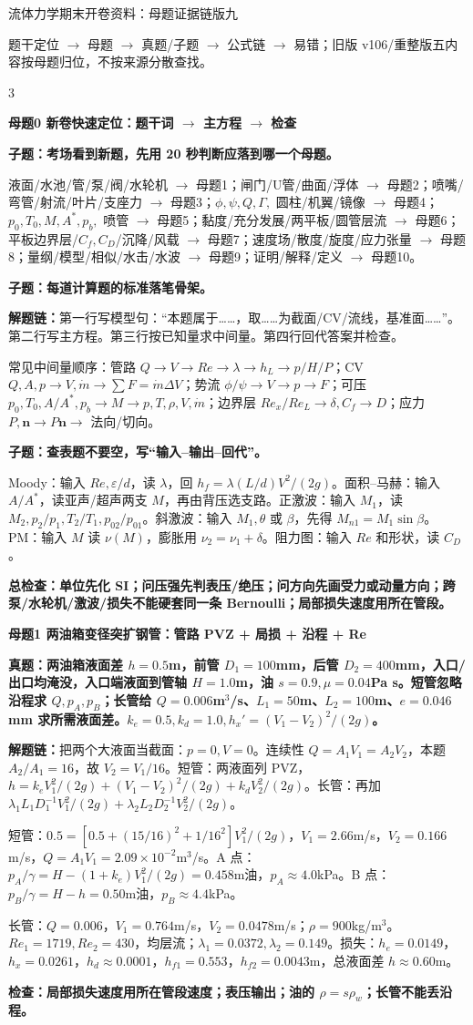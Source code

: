 \documentclass[a4paper]{article}
\newcommand{\mt}[1]{\vspace{0.45pt}\colorbox{M}{\parbox{\dimexpr\linewidth-2\fboxsep}{\color{white}\bfseries #1}}\par}
\newcommand{\qt}[1]{\vspace{0.25pt}\colorbox{Q}{\parbox{\dimexpr\linewidth-2\fboxsep}{\color{white}\bfseries #1}}\par}
\newcommand{\ans}[1]{\colorbox{G}{\parbox{\dimexpr\linewidth-2\fboxsep}{#1}}\par}
\newcommand{\warn}[1]{\colorbox{Y}{\parbox{\dimexpr\linewidth-2\fboxsep}{\color{E}\bfseries #1}}\par}
\newcommand{\chain}[1]{{\color{A}\bfseries 解题链：}#1\par}
\begin{document}
\fontsize{3.08}{3.22}\selectfont
\begin{center}
{\heiti\fontsize{6.5}{6.8}\selectfont 流体力学期末开卷资料：母题证据链版九}\par
{\fontsize{3.20}{3.38}\selectfont 题干定位 $\to$ 母题 $\to$ 真题/子题 $\to$ 公式链 $\to$ 易错；旧版 v106/重整版五内容按母题归位，不按来源分散查找。}
\end{center}
\vspace{-3.4pt}
\begin{multicols}{3}

\mt{母题0 新卷快速定位：题干词 $\to$ 主方程 $\to$ 检查}
\qt{子题：考场看到新题，先用 20 秒判断应落到哪一个母题。}
\ans{液面/水池/管/泵/阀/水轮机 $\to$ 母题1；闸门/U管/曲面/浮体 $\to$ 母题2；喷嘴/弯管/射流/叶片/支座力 $\to$ 母题3；$\phi,\psi,Q,\Gamma,$ 圆柱/机翼/镜像 $\to$ 母题4；$p_0,T_0,M,A^*,p_b,$ 喷管 $\to$ 母题5；黏度/充分发展/两平板/圆管层流 $\to$ 母题6；平板边界层/$C_f,C_D$/沉降/风载 $\to$ 母题7；速度场/散度/旋度/应力张量 $\to$ 母题8；量纲/模型/相似/水击/水波 $\to$ 母题9；证明/解释/定义 $\to$ 母题10。}
\qt{子题：每道计算题的标准落笔骨架。}
\chain{第一行写模型句：“本题属于……，取……为截面/CV/流线，基准面……”。第二行写主方程。第三行按已知量求中间量。第四行回代答案并检查。}
\ans{常见中间量顺序：管路 $Q\to V\to Re\to\lambda\to h_L\to p/H/P$；CV $Q,A,p\to V,\dot m\to \sum F=\dot m\Delta V$；势流 $\phi/\psi\to V\to p\to F$；可压 $p_0,T_0,A/A^*,p_b\to M\to p,T,\rho,V,\dot m$；边界层 $Re_x/Re_L\to\delta,C_f\to D$；应力 $P,\bm n\to P\bm n\to$ 法向/切向。}
\qt{子题：查表题不要空，写“输入--输出--回代”。}
\ans{Moody：输入 $Re,\varepsilon/d$，读 $\lambda$，回 $h_f=\lambda(L/d)V^2/(2g)$。面积--马赫：输入 $A/A^*$，读亚声/超声两支 $M$，再由背压选支路。正激波：输入 $M_1$，读 $M_2,p_2/p_1,T_2/T_1,p_{02}/p_{01}$。斜激波：输入 $M_1,\theta$ 或 $\beta$，先得 $M_{n1}=M_1\sin\beta$。PM：输入 $M$ 读 $\nu(M)$，膨胀用 $\nu_2=\nu_1+\delta$。阻力图：输入 $Re$ 和形状，读 $C_D$。}
\warn{总检查：单位先化 SI；问压强先判表压/绝压；问方向先画受力或动量方向；跨泵/水轮机/激波/损失不能硬套同一条 Bernoulli；局部损失速度用所在管段。}


\mt{母题1 两油箱变径突扩钢管：管路 PVZ + 局损 + 沿程 + Re}
\qt{真题：两油箱液面差 $h=0.5$m，前管 $D_1=100$mm，后管 $D_2=400$mm，入口/出口均淹没，入口端液面到管轴 $H=1.0$m，油 $s=0.9,\mu=0.04$Pa s。短管忽略沿程求 $Q,p_A,p_B$；长管给 $Q=0.006$m$^3$/s、$L_1=50$m、$L_2=100$m、$e=0.046$mm 求所需液面差。$k_e=0.5,k_d=1.0,h_x'=(V_1-V_2)^2/(2g)$。}
\chain{把两个大液面当截面：$p=0,V=0$。连续性 $Q=A_1V_1=A_2V_2$，本题 $A_2/A_1=16$，故 $V_2=V_1/16$。短管：两液面列 PVZ，$h=k_eV_1^2/(2g)+(V_1-V_2)^2/(2g)+k_dV_2^2/(2g)$。长管：再加 $\lambda_1L_1D_1^{-1}V_1^2/(2g)+\lambda_2L_2D_2^{-1}V_2^2/(2g)$。}
\ans{短管：$0.5=[0.5+(15/16)^2+1/16^2]V_1^2/(2g)$，$V_1=2.66$m/s，$V_2=0.166$m/s，$Q=A_1V_1=2.09\times10^{-2}$m$^3$/s。A 点：$p_A/\gamma=H-(1+k_e)V_1^2/(2g)=0.458$m油，$p_A\approx4.0$kPa。B 点：$p_B/\gamma=H-h=0.50$m油，$p_B\approx4.4$kPa。}
\ans{长管：$Q=0.006$，$V_1=0.764$m/s，$V_2=0.0478$m/s；$\rho=900$kg/m$^3$。$Re_1=1719,Re_2=430$，均层流；$\lambda_1=0.0372,\lambda_2=0.149$。损失：$h_e=0.0149$，$h_x=0.0261$，$h_d\approx0.0001$，$h_{f1}=0.553$，$h_{f2}=0.0043$m，总液面差 $h\approx0.60$m。}
\warn{检查：局部损失速度用所在管段速度；表压输出；油的 $\rho=s\rho_w$；长管不能丢沿程。}


\end{multicols}
\end{document}
